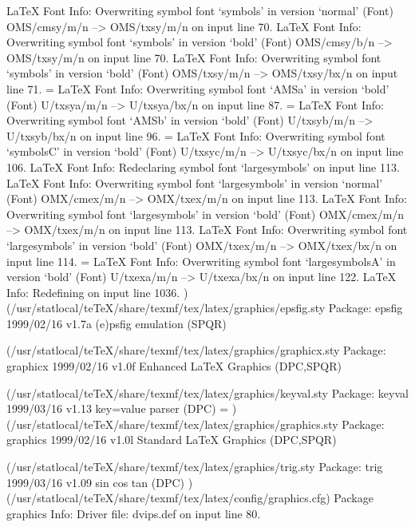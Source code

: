 LaTeX Font Info:    Overwriting symbol font `symbols' in version `normal'
(Font)                  OMS/cmsy/m/n --> OMS/txsy/m/n on input line 70.
LaTeX Font Info:    Overwriting symbol font `symbols' in version `bold'
(Font)                  OMS/cmsy/b/n --> OMS/txsy/m/n on input line 70.
LaTeX Font Info:    Overwriting symbol font `symbols' in version `bold'
(Font)                  OMS/txsy/m/n --> OMS/txsy/bx/n on input line 71.
\symAMSa=
LaTeX Font Info:    Overwriting symbol font `AMSa' in version `bold'
(Font)                  U/txsya/m/n --> U/txsya/bx/n on input line 87.
\symAMSb=
LaTeX Font Info:    Overwriting symbol font `AMSb' in version `bold'
(Font)                  U/txsyb/m/n --> U/txsyb/bx/n on input line 96.
\symsymbolsC=
LaTeX Font Info:    Overwriting symbol font `symbolsC' in version `bold'
(Font)                  U/txsyc/m/n --> U/txsyc/bx/n on input line 106.
LaTeX Font Info:    Redeclaring symbol font `largesymbols' on input line 113.
LaTeX Font Info:    Overwriting symbol font `largesymbols' in version `normal'
(Font)                  OMX/cmex/m/n --> OMX/txex/m/n on input line 113.
LaTeX Font Info:    Overwriting symbol font `largesymbols' in version `bold'
(Font)                  OMX/cmex/m/n --> OMX/txex/m/n on input line 113.
LaTeX Font Info:    Overwriting symbol font `largesymbols' in version `bold'
(Font)                  OMX/txex/m/n --> OMX/txex/bx/n on input line 114.
\symlargesymbolsA=
LaTeX Font Info:    Overwriting symbol font `largesymbolsA' in version `bold'
(Font)                  U/txexa/m/n --> U/txexa/bx/n on input line 122.
LaTeX Info: Redefining \not on input line 1036.
)
(/usr/statlocal/teTeX/share/texmf/tex/latex/graphics/epsfig.sty
Package: epsfig 1999/02/16 v1.7a (e)psfig emulation (SPQR)

(/usr/statlocal/teTeX/share/texmf/tex/latex/graphics/graphicx.sty
Package: graphicx 1999/02/16 v1.0f Enhanced LaTeX Graphics (DPC,SPQR)

(/usr/statlocal/teTeX/share/texmf/tex/latex/graphics/keyval.sty
Package: keyval 1999/03/16 v1.13 key=value parser (DPC)
\KV@toks@=
)
(/usr/statlocal/teTeX/share/texmf/tex/latex/graphics/graphics.sty
Package: graphics 1999/02/16 v1.0l Standard LaTeX Graphics (DPC,SPQR)

(/usr/statlocal/teTeX/share/texmf/tex/latex/graphics/trig.sty
Package: trig 1999/03/16 v1.09 sin cos tan (DPC)
)
(/usr/statlocal/teTeX/share/texmf/tex/latex/config/graphics.cfg)
Package graphics Info: Driver file: dvips.def on input line 80.


